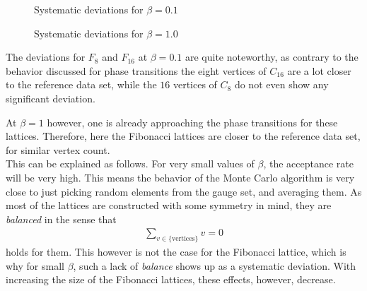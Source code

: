 \begin{figure}[!hbt]
 \centering
 
 \caption{Systematic deviations for $\beta = 0.1$}
 \label{plot:systemBeta01}
\end{figure}
\begin{figure}[!hbt]
 \centering
 
 \caption{Systematic deviations for $\beta = 1.0$}
 \label{plot:systemBeta10}
\end{figure}

The deviations for $F_8$ and $F_{16}$ at $\beta=0.1$ are quite noteworthy, as contrary to the behavior discussed for phase transitions the eight vertices of $C_{16}$ are a lot closer to the reference data set, while the $16$ vertices of $C_8$ do not even show any significant deviation.

At $\beta=1$ however, one is already approaching the phase transitions for these lattices. Therefore, here the Fibonacci lattices are closer to the reference data set, for similar vertex count.\\

This can be explained as follows. For very small values of $\beta$, the acceptance rate will be very high. This means the behavior of the Monte Carlo algorithm is very close to just picking random elements from the gauge set, and averaging them. As most of the lattices are constructed with some symmetry in mind, they are \emph{balanced} in the sense that
\begin{align*}
 \sum_{v \in \{\textrm{vertices}\}} v = 0
\end{align*}
holds for them. This however is not the case for the Fibonacci lattice, which is why for small $\beta$, such a lack of \emph{balance} shows up as a systematic deviation. With increasing the size of the Fibonacci lattices, these effects, however, decrease.

\FloatBarrier
